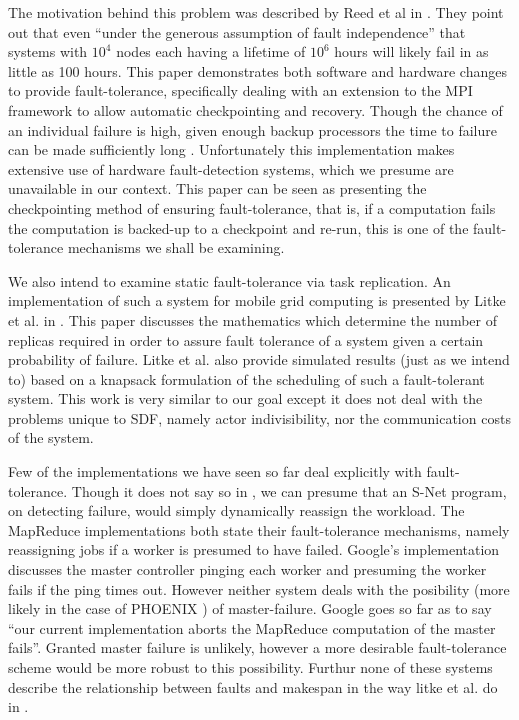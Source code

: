 The motivation behind this problem was described by Reed et al in \cite{ree06}.
They point out that even ``under the generous assumption of fault independence'' that systems with $10^4$ nodes each having a lifetime of $10^6$ hours will likely fail in as little as 100 hours.
This paper demonstrates both software and hardware changes to provide fault-tolerance, specifically dealing with an extension to the MPI framework to allow automatic checkpointing and recovery.
Though the chance of an individual failure is high, given enough backup processors the time to failure can be made sufficiently long \cite{ree06}.
Unfortunately this implementation makes extensive use of hardware fault-detection systems, which we presume are unavailable in our context.
This paper can be seen as presenting the checkpointing method of ensuring fault-tolerance, that is, if a computation fails the computation is backed-up to a checkpoint and re-run, this is one of the fault-tolerance mechanisms we shall be examining.

We also intend to examine static fault-tolerance via task replication.
An implementation of such a system for mobile grid computing is presented by Litke et al. in \cite{lit07}.
This paper discusses the mathematics which determine the number of replicas required in order to assure fault tolerance of a system given a certain probability of failure.
Litke et al. also provide simulated results (just as we intend to) based on a knapsack formulation of the scheduling of such a fault-tolerant system.
This work is very similar to our goal except it does not deal with the problems unique to SDF, namely actor indivisibility, nor the communication costs of the system.

Few of the implementations we have seen so far deal explicitly with fault-tolerance.
Though it does not say so in \cite{pen09}, we can presume that an S-Net program, on detecting failure, would simply dynamically reassign the workload.
The MapReduce implementations \cite{dea08, ran07} both state their fault-tolerance mechanisms, namely reassigning jobs if a worker is presumed to have failed.
Google's implementation discusses the master controller pinging each worker and presuming the worker fails if the ping times out.
However neither system deals with the posibility (more likely in the case of PHOENIX \cite{ran07}) of master-failure.
Google goes so far as to say ``our current implementation aborts the MapReduce computation of the master fails''.
Granted master failure is unlikely, however a more desirable fault-tolerance scheme would be more robust to this possibility.
Furthur none of these systems describe the relationship between faults and makespan in the way litke et al. do in \cite{lit07}.

